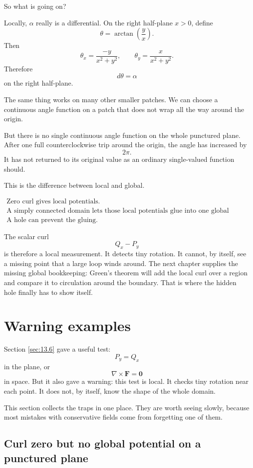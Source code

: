 So what is going on?

Locally, \(\alpha\) really is a differential.  On the right half-plane \(x>0\), define
\[
    \theta=\arctan\left(\frac{y}{x}\right).
\]
Then
\[
    \theta_x=\frac{-y}{x^2+y^2},
    \qquad
    \theta_y=\frac{x}{x^2+y^2}.
\]
Therefore
\[
\boxed{
    d\theta=\alpha
}
\]
on the right half-plane.

The same thing works on many other smaller patches.  We can choose a continuous angle
function on a patch that does not wrap all the way around the origin.

But there is no single continuous angle function on the whole punctured plane.  After
one full counterclockwise trip around the origin, the angle has increased by
\[
    2\pi.
\]
It has not returned to its original value as an ordinary single-valued function should.

This is the difference between local and global.

\[
\boxed{
\begin{array}{c}
\text{Zero curl gives local potentials.}\\[1mm]
\text{A simply connected domain lets those local potentials glue into one global potential.}\\[1mm]
\text{A hole can prevent the gluing.}
\end{array}
}
\]

The scalar curl
\[
    Q_x-P_y
\]
is therefore a local measurement.  It detects tiny rotation.  It cannot, by itself, see a
missing point that a large loop winds around.  The next chapter supplies the missing
global bookkeeping: Green's theorem will add the local curl over a region and compare
it to circulation around the boundary.  That is where the hidden hole finally has to
show itself.
\section{Warning examples}
\label{sec:13.7}

Section \ref{sec:13.6} gave a useful test:
\[
    P_y=Q_x
\]
in the plane, or
\[
    \nabla\times\mathbf F=\mathbf 0
\]
in space.  But it also gave a warning: this test is local.  It checks tiny rotation near
each point.  It does not, by itself, know the shape of the whole domain.

This section collects the traps in one place.  They are worth seeing slowly, because most
mistakes with conservative fields come from forgetting one of them.

\subsection{Curl zero but no global potential on a punctured plane}

